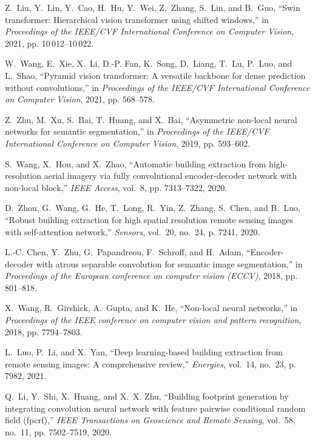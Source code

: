\documentclass[lettersize,journal]{IEEEtran}
\begin{document}
\begin{thebibliography}{10}
Z.~Liu, Y.~Lin, Y.~Cao, H.~Hu, Y.~Wei, Z.~Zhang, S.~Lin, and B.~Guo, ``Swin
  transformer: Hierarchical vision transformer using shifted windows,'' in
  \emph{Proceedings of the IEEE/CVF International Conference on Computer
  Vision}, 2021, pp. 10\,012--10\,022.

W.~Wang, E.~Xie, X.~Li, D.-P. Fan, K.~Song, D.~Liang, T.~Lu, P.~Luo, and
  L.~Shao, ``Pyramid vision transformer: A versatile backbone for dense
  prediction without convolutions,'' in \emph{Proceedings of the IEEE/CVF
  International Conference on Computer Vision}, 2021, pp. 568--578.

Z.~Zhu, M.~Xu, S.~Bai, T.~Huang, and X.~Bai, ``Asymmetric non-local neural
  networks for semantic segmentation,'' in \emph{Proceedings of the IEEE/CVF
  International Conference on Computer Vision}, 2019, pp. 593--602.

S.~Wang, X.~Hou, and X.~Zhao, ``Automatic building extraction from
  high-resolution aerial imagery via fully convolutional encoder-decoder
  network with non-local block,'' \emph{IEEE Access}, vol.~8, pp. 7313--7322,
  2020.

D.~Zhou, G.~Wang, G.~He, T.~Long, R.~Yin, Z.~Zhang, S.~Chen, and B.~Luo,
  ``Robust building extraction for high spatial resolution remote sensing
  images with self-attention network,'' \emph{Sensors}, vol.~20, no.~24, p.
  7241, 2020.

L.-C. Chen, Y.~Zhu, G.~Papandreou, F.~Schroff, and H.~Adam, ``Encoder-decoder
  with atrous separable convolution for semantic image segmentation,'' in
  \emph{Proceedings of the European conference on computer vision (ECCV)},
  2018, pp. 801--818.

X.~Wang, R.~Girshick, A.~Gupta, and K.~He, ``Non-local neural networks,'' in
  \emph{Proceedings of the IEEE conference on computer vision and pattern
  recognition}, 2018, pp. 7794--7803.

L.~Luo, P.~Li, and X.~Yan, ``Deep learning-based building extraction from
  remote sensing images: A comprehensive review,'' \emph{Energies}, vol.~14,
  no.~23, p. 7982, 2021.

Q.~Li, Y.~Shi, X.~Huang, and X.~X. Zhu, ``Building footprint generation by
  integrating convolution neural network with feature pairwise conditional
  random field (fpcrf),'' \emph{IEEE Transactions on Geoscience and Remote
  Sensing}, vol.~58, no.~11, pp. 7502--7519, 2020.


\end{thebibliography}
\end{document}
